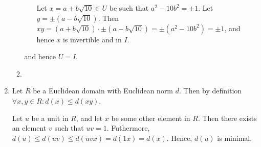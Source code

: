\documentclass[11pt]{article} \usepackage{amssymb}
\begin{document}
\begin{enumerate}
\begin{enumerate}
\begin{enumerate}
            Let $x=a+b\sqrt{10}\in U$ 
            be such that $a^2-10b^2=\pm1$. Let $y=\pm (a- b\sqrt{10})$. Then
            $xy=(a+b\sqrt{10})\cdot\pm(a- b\sqrt{10})=
            \pm (a^2- 10b^2)=\pm 1$, and hence
            $x$ is invertible and in $I$.
          \end{enumerate}
          and hence $U=I$.  
        \item 
    \end{enumerate}
  \item Let $R$ be a Euclidean domain with Euclidean norm $d$. Then by
    definition $\forall x,y\in R:d(x)\leq d(xy)$. 

    Let $u$
    be a unit in $R$, and let $x$ be some other element in $R$. Then
    there exists an element $v$ such that $uv=1$. Futhermore, 
    $d(u)\leq d(uv) \leq d(uvx) = d(1x) = d(x)$. Hence, $d(u)$ is minimal.
    
      
\end{enumerate}
\end{document}
